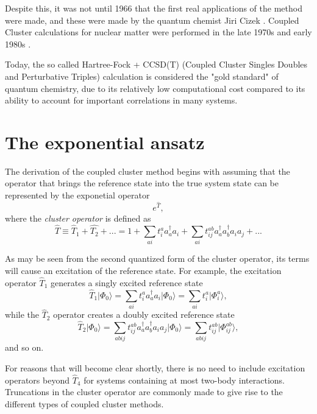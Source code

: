 Despite this, it was not until 1966 that the first real applications
of the method were made, and these were made by the quantum chemist Jiri
Cizek \cite{Cizek1966}. Coupled Cluster calculations for nuclear
matter were performed in the late 1970s and early 1980s \cite{kummel1978,day1981}.

Today, the so called Hartree-Fock + CCSD(T) (Coupled Cluster Singles
Doubles and Perturbative Triples) calculation is considered the "gold
standard" of quantum chemistry, due to its relatively low
computational cost compared to its ability to account for important
correlations in many systems.


\section{The exponential ansatz}
The derivation of the coupled cluster method begins with assuming that
the operator that brings the reference state into the true system
state can be represented by the exponetial operator
\begin{equation}
e^{\hat{T}} ,
\label{eqn:exponential_ansatz}
\end{equation}
where the \emph{cluster operator} is defined as
\begin{equation}
\hat{T} \equiv  \hat{T}_1 + \hat{T_2} + ... = 1 + \sum_{ai} t_i^a a_{a}^\dagger a_i + \sum_{ai} t_{ij}^{ab} a_{a}^\dagger a_{b}^\dagger a_i a_j + ...
\end{equation}

As may be seen from the second quantized form of the cluster operator,
its terms will cause an excitation of the reference state. For
example, the excitation operator $\hat{T}_1$ generates  a singly
excited reference state
\begin{equation}
\hat{T}_1\vert \Phi_0\rangle = \sum_{ai} t_i^a a_{a}^\dagger a_i|\Phi_0\rangle = \sum_{ai} t_i^a \vert \Phi_i^a\rangle,
\end{equation}
while the $\hat{T}_2$ operator creates a doubly excited reference state
\begin{equation}
\hat{T}_2 \vert \Phi_0\rangle = \sum_{abij} t_{ij}^{ab} a_{a}^\dagger a_{b}^\dagger a_i a_j|\Phi_0\rangle = \sum_{abij} t_{ij}^{ab} \vert \Phi_{ij}^{ab}\rangle,
\end{equation}
and so on. 

For reasons that will become clear shortly, there is no need to
include excitation operators beyond $\hat{T}_4$ for systems containing
at most two-body interactions. Truncations in the cluster operator are
commonly made to give rise to the different types of coupled cluster
methods.

